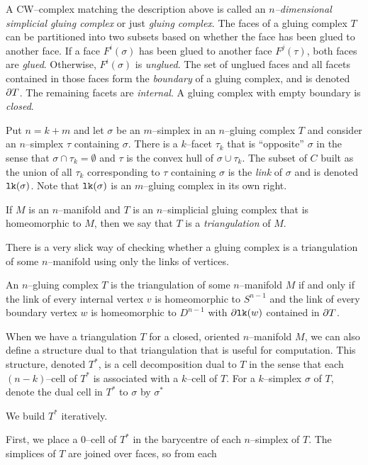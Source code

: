 \begin{defn}
  A CW--complex matching the description above is called an \emph{$n$--dimensional simplicial gluing complex} or just \emph{gluing complex}.
  The faces of a gluing complex $T$ can be partitioned into two subsets based on whether the face has been glued to another face.
  If a face $F^i(\sigma)$ has been glued to another face $F^j(\tau)$, both faces are \emph{glued}.
  Otherwise, $F^i(\sigma)$ is \emph{unglued}.
  The set of unglued faces and all facets contained in those faces form the \emph{boundary} of a gluing complex, and is denoted $\partial T$.
  The remaining facets are \emph{internal}.
  A gluing complex with empty boundary is \emph{closed}.

  Put $n=k+m$ and let $\sigma$ be an $m$--simplex in an $n$--gluing complex $T$ and consider an $n$--simplex $\tau$ containing $\sigma$.
  There is a $k$--facet $\tau_k$ that is ``opposite'' $\sigma$ in the sense that $\sigma\cap\tau_k=\emptyset$ and $\tau$ is the convex hull of $\sigma\cup\tau_k$.
  The subset of $C$ built as the union of all $\tau_k$ corresponding to $\tau$ containing $\sigma$ is the \emph{link} of $\sigma$ and is denoted $\texttt{lk}(\sigma)$.
  Note that $\texttt{lk}(\sigma)$ is an $m$--gluing complex in its own right.

  If $M$ is an $n$--manifold and $T$ is an $n$--simplicial gluing complex that is homeomorphic to $M$, then we say that $T$ is a \emph{triangulation} of $M$.
\end{defn}

There is a very slick way of checking whether a gluing complex is a triangulation of some $n$--manifold using only the links of vertices.

\begin{theorem}
  An $n$--gluing complex $T$ is the triangulation of some $n$--manifold $M$ if and only if the link of every internal vertex $v$ is homeomorphic to $S^{n-1}$ and the link of every boundary vertex $w$ is homeomorphic to $D^{n-1}$ with $\partial\texttt{lk}(w)$ contained in $\partial T$.
\end{theorem}

When we have a triangulation $T$ for a closed, oriented $n$--manifold $M$, we can also define a structure dual to that triangulation that is useful for computation.
This structure, denoted $T^*$, is a cell decomposition dual to $T$ in the sense that each $(n-k)$--cell of $T^*$ is associated with a $k$--cell of $T$.
For a $k$--simplex $\sigma$ of $T$, denote the dual cell in $T^*$ to $\sigma$ by $\sigma^*$


We build $T^*$ iteratively.

First, we place a 0--cell of $T^*$ in the barycentre of each $n$--simplex of $T$.
The simplices of $T$ are joined over faces, so from each 




